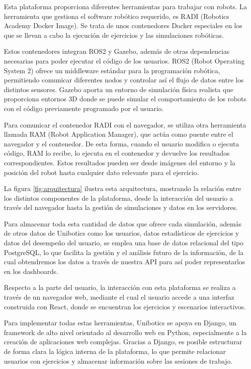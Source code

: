 \documentclass[a4paper, 12pt]{book}
\begin{document}
Esta plataforma proporciona diferentes herramientas para trabajar con robots. La herramienta que gestiona el software robótico requerido, es RADI (Robotics Academy Docker Image). Se trata de unos contenedores Docker especiales en los que se llevan a cabo la ejecución de ejercicios y las simulaciones robóticas.

Estos contenedores integran ROS2 y Gazebo, además de otras dependencias necesarias para poder ejecutar el código de los usuarios. ROS2 (Robot Operating System 2) ofrece un middleware estándar para la programación robótica, permitiendo comunicar diferentes nodos y controlar así el flujo de datos entre los distintos sensores. Gazebo aporta un entorno de simulación física realista que proporciona entornos 3D donde se puede simular el comportamiento de los robots con el código previamente programado por el usuario.

Para comunicar el contenedor RADI con el navegador, se utiliza otra herramienta llamada RAM (Robot Application Manager), que actúa como puente entre el navegador y el contenedor. De esta forma, cuando el usuario modifica o ejecuta código, RAM lo recibe, lo ejecuta en el contenedor y devuelve los resultados correspondientes. Estos resultados pueden ser desde imágenes del entorno y la posición del robot hasta cualquier dato relevante para el ejercicio.

La figura \ref{fig:arquitectura} ilustra esta arquitectura, mostrando la relación entre los distintos componentes de la plataforma, desde la interacción del usuario a través del navegador hasta la gestión de simulaciones y datos en los servidores.

Para almacenar toda esta cantidad de datos que ofrece cada simulación, además de otros datos de Unibotics como los usuarios, datos estadísticos de ejercicios y datos del desempeño del usuario, se emplea una base de datos relacional del tipo PostgreSQL, lo que facilita la gestión y el análisis futuro de la información, de la cual obtendremos los datos a través de nuestra API para así poder representarlos en los dashboards.

Respecto a la parte del usuario, la interacción con esta plataforma se realiza a través de un navegador web, mediante el cual el usuario accede a una interfaz construida con React, donde se encuentran los ejercicios y escenarios interactivos.

Para implementar todas estas herramientas, Unibotics se apoya en Django, un framework de alto nivel orientado al desarrollo web en Python, especialmente a la creación de aplicaciones web complejas. Gracias a Django, es posible estructurar de forma clara la lógica interna de la plataforma, lo que permite relacionar usuarios con ejercicios y almacenar información sobre las sesiones de trabajo.
\end{document}
